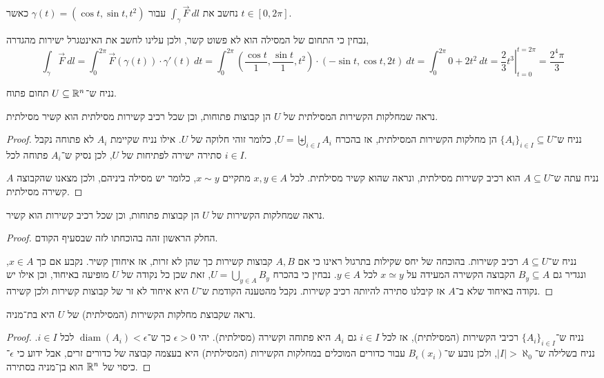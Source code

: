 \subquestion{}
נחשב את $\int_{\gamma} \vec{F}\ dl$ עבור $\gamma(t) = (\cos t, \sin t, t^2)$ כאשר $t \in [0, 2 \pi]$.
\begin{solution}
	נבחין כי התחום של המסילה הוא לא פשוט קשר, ולכן עלינו לחשב את האינטגרל ישירות מהגדרה,
	\[
		\int_{\gamma} \vec{F}\ dl
		= \int_{0}^{2 \pi} \vec{F}(\gamma(t)) \cdot \gamma'(t)\ dt
		= \int_{0}^{2 \pi} (\frac{\cos t}{1}, \frac{\sin t}{1}, t^2) \cdot (-\sin t, \cos t, 2t)\ dt
		= \int_{0}^{2 \pi} 0 + 2t^2\ dt
		= {\left. \frac{2}{3} t^3 \right|}_{t = 0}^{t = 2 \pi}
		= \frac{2^4 \pi}{3}
	\]
\end{solution}

\question{}
נניח ש־$U \subseteq \mathbb{R}^n$ תחום פתוח.

\subquestion[2]
נראה שמחלקות הקשירות המסילתית של $U$ הן קבוצות פתוחות, וכן שכל רכיב קשירות מסילתית הוא קשיר מסילתית.
\begin{proof}
	נניח ש־${\{ A_i \}}_{i \in I} \subseteq U$ הן מחלקות הקשירות המסילתית, אז בהכרח $U = \biguplus_{i \in I} A_i$, כלומר זוהי חלוקה של $U$.
	אילו נניח שקיימת $A_i$ לא פתוחה נקבל סתירה ישירה לפתיחות של $U$, לכן נסיק ש־$A_i$ פתוחה לכל $i \in I$.

	נניח עתה ש־$A \subseteq U$ הוא רכיב קשירות מסילתית, ונראה שהוא קשיר מסילתית.
	לכל $x, y \in A$ מתקיים $x \sim y$, כלומר יש מסילה ביניהם, ולכן מצאנו שהקבוצה $A$ קשירה מסילתית.
\end{proof}

\subquestion{}
נראה שמחלקות הקשירות של $U$ הן קבוצות פתוחות, וכן שכל רכיב קשירות הוא קשיר.
\begin{proof}
	החלק הראשון זהה בהוכחתו לזה שבסעיף הקודם.

	נניח ש־$A \subseteq U$ רכיב קשירות.
	בהוכחה של יחס שקילות בתרגול ראינו כי אם $A, B$ קבוצות קשירות כך שהן לא זרות, אז איחודן קשיר.
	נקבע אם כך $x \in A$, ונגדיר גם $B_y \subseteq A$ הקבוצה הקשירה המעידה על $x \simeq y$ לכל $y \in A$.
	נבחין כי בהכרח $U = \bigcup_{y \in A} B_y$, זאת שכן כל נקודה של $U$ מופיעה באיחוד, וכן אילו יש נקודה באיחוד שלא ב־$A$ אז קיבלנו סתירה להיותה רכיב קשירות.
	נקבל מהטענה הקודמת ש־$U$ היא איחוד לא זר של קבוצות קשירות ולכן קשירה.
\end{proof}

\subquestion{}
נראה שקבוצת מחלקות הקשירות (המסילתית) של $U$ היא בת־מניה.
\begin{proof}
	נניח ש־${\{ A_i \}}_{i \in I}$ רכיבי הקשירות (המסילתית), אז לכל $i \in I$ גם $A_i$ היא פתוחה וקשירה (מסילתית).
	יהי $\epsilon > 0$ כך ש־$\operatorname{diam}(A_i) < \epsilon$ לכל $i \in I$.
	נניח בשלילה ש־$|I| > \aleph_0$, ולכן נובע ש־$B_{\epsilon}(x_i)$ עבור כדורים המוכלים במחלקות הקשירות (המסילתית) היא בעצמה קבוצה של כדורים זרים, אבל ידוע כי $\epsilon$־כיסוי של $\mathbb{R}^n$ הוא בן־מניה בסתירה.
\end{proof}

